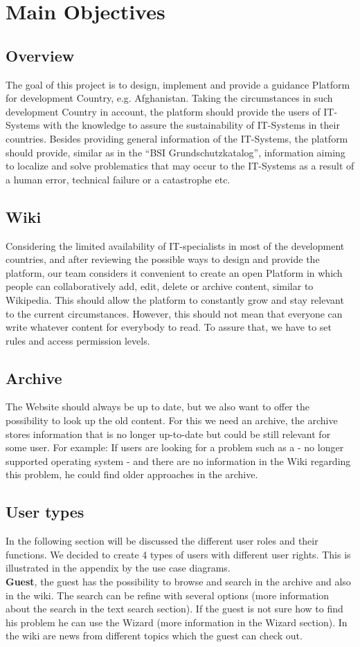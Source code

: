 \chapter{Main Objectives}
\section{Overview}
The goal of this project is to design, implement and provide a guidance Platform for development Country, e.g. Afghanistan. Taking the circumstances in such development Country in account, the platform should provide the users of IT-Systems with the knowledge to assure the sustainability of IT-Systems in their countries. Besides providing general information of the IT-Systems, the platform should provide, similar as in the “BSI Grundschutzkatalog”, information aiming to localize and solve problematics that may occur to the IT-Systems as a result of a human error, technical failure or a catastrophe etc. 

\section{Wiki}
Considering the limited availability of IT-specialists in most of the development countries, and after reviewing the possible ways to design and provide the platform, our team considers it convenient to create an open Platform in which people can collaboratively add, edit, delete or archive content, similar to Wikipedia. This should allow the platform to constantly grow and stay relevant to the current circumstances. However, this should not mean that everyone can write whatever content for everybody to read. To assure that, we have to set rules and access permission levels. 

\section{Archive}
\label{archive}
The Website should always be up to date, but we also want to offer the possibility to look up the old content. For this we need an archive,
the archive stores information that is no longer up-to-date but could be still relevant for some user. For example: If users are looking for a problem such as a - no longer supported operating system - and there are no information in the Wiki regarding this problem, he could find older approaches in the archive. 
\section{User types}
In the following section will be discussed the different user roles and their functions. We decided to create 4 types of users with different user rights. This is illustrated in the appendix by the use case diagrams. 
\\
\textbf{Guest}, the guest has the possibility to browse and search in the archive and also in the wiki. The search can be refine with several options (more information about the search in the text search section). If the guest is not sure how to find his problem he can use the Wizard (more information in the Wizard section). In the wiki are news from different topics which the guest can check out.

